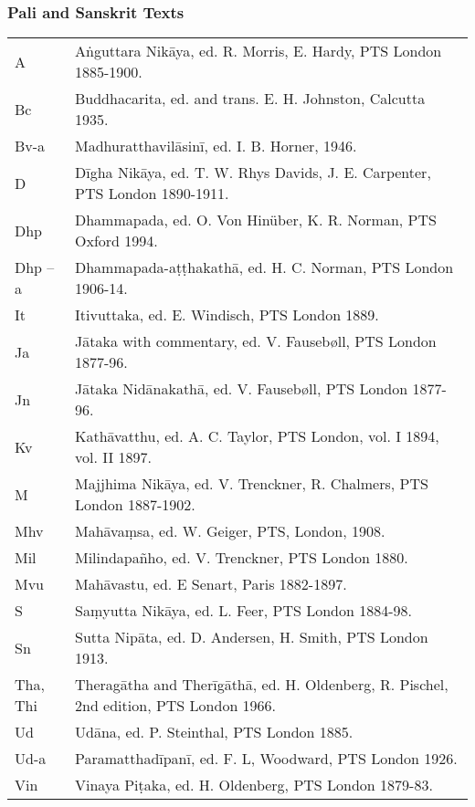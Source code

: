 \subsubsection{Pali and Sanskrit Texts}

\begin{longtable}[]{@{}ll@{}}
\toprule\noalign{}
\endhead
\bottomrule\noalign{}
\endlastfoot
A & Aṅguttara Nikāya, ed. R. Morris, E. Hardy, PTS London 1885-1900. \\
Bc & Buddhacarita, ed. and trans. E. H. Johnston, Calcutta 1935. \\
Bv-a & Madhuratthavilāsinī, ed. I. B. Horner, 1946. \\
D & Dīgha Nikāya, ed. T. W. Rhys Davids, J. E. Carpenter, PTS London
1890-1911. \\
Dhp & Dhammapada, ed. O. Von Hinüber, K. R. Norman, PTS Oxford 1994.~ \\
Dhp --a & Dhammapada-aṭṭhakathā, ed. H. C. Norman, PTS London
1906-14. \\
It & Itivuttaka, ed. E. Windisch, PTS London 1889. \\
Ja & Jātaka with commentary, ed. V. Fausebøll, PTS London 1877-96.~ \\
Jn & Jātaka Nidānakathā, ed. V. Fausebøll, PTS London 1877-96. \\
Kv & Kathāvatthu, ed. A. C. Taylor, PTS London, vol. I 1894, vol. II
1897. \\
M & Majjhima Nikāya, ed. V. Trenckner, R. Chalmers, PTS London
1887-1902. \\
Mhv & Mahāvaṃsa, ed. W. Geiger, PTS, London, 1908. \\
Mil & Milindapañho, ed. V. Trenckner, PTS London 1880. \\
Mvu & Mahāvastu, ed. E Senart, Paris 1882-1897. \\
S & Saṃyutta Nikāya, ed. L. Feer, PTS London 1884-98. \\
Sn & Sutta Nipāta, ed. D. Andersen, H. Smith, PTS London 1913. \\
Tha, Thi & Theragātha and Therīgāthā, ed. H. Oldenberg, R. Pischel,
2{nd} edition, PTS London 1966. \\
Ud & Udāna, ed. P. Steinthal, PTS London 1885. \\
Ud-a & Paramatthadīpanī, ed. F. L, Woodward, PTS London 1926. \\
Vin & Vinaya Piṭaka, ed. H. Oldenberg, PTS London 1879-83. \\
\end{longtable}

